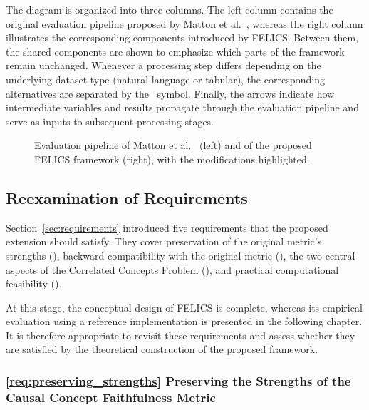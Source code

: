 The diagram is organized into three columns. The left column contains the original evaluation pipeline proposed by Matton et al.~\cite{mattonWalkTalkMeasuring2024}, whereas the right column illustrates the corresponding components introduced by FELICS. Between them, the shared components are shown to emphasize which parts of the framework remain unchanged. Whenever a processing step differs depending on the underlying dataset type (natural-language or tabular), the corresponding alternatives are separated by the \textbullet\ symbol. Finally, the arrows indicate how intermediate variables and results propagate through the evaluation pipeline and serve as inputs to subsequent processing stages.

\begin{figure}
	\centering
	
	\caption[Evaluation pipelines of Matton et al. and FELICS compared]{Evaluation pipeline of Matton et al.~\cite{mattonWalkTalkMeasuring2024} (left) and of the proposed FELICS framework (right), with the modifications highlighted.}
	\label{fig:comparison_matton_felics}
\end{figure}

\subsection{Reexamination of Requirements}
\label{sec:requirements_reexamination}
Section~\ref{sec:requirements} introduced five requirements that the proposed extension should satisfy. They cover preservation of the original metric's strengths (), backward compatibility with the original metric (), the two central aspects of the Correlated Concepts Problem (), and practical computational feasibility ().

At this stage, the conceptual design of FELICS is complete, whereas its empirical evaluation using a reference implementation is presented in the following chapter. It is therefore appropriate to revisit these requirements and assess whether they are satisfied by the theoretical construction of the proposed framework.

\subsubsection{\ref{req:preserving_strengths} Preserving the Strengths of the Causal Concept Faithfulness Metric}

